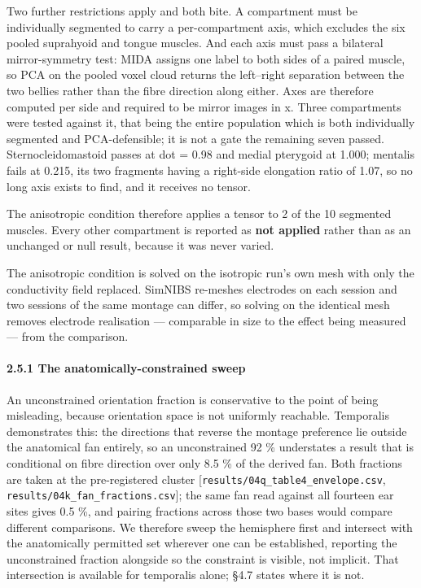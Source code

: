 \documentclass[
  11pt,
  letterpaper,
]{article}
\begin{document}
Two further restrictions apply and both bite. A compartment must be individually
segmented to carry a per-compartment axis, which excludes the six pooled
suprahyoid and tongue muscles. And each axis must pass a bilateral
mirror-symmetry test: MIDA assigns one label to both sides of a paired muscle,
so PCA on the pooled voxel cloud returns the left--right separation between the
two bellies rather than the fibre direction along either. Axes are therefore
computed per side and required to be mirror images in x. Three compartments were
tested against it, that being the entire population which is both individually
segmented and PCA-defensible; it is not a gate the remaining seven passed.
Sternocleidomastoid
passes at \textbar dot\textbar{} = 0.98 and medial pterygoid at 1.000; mentalis fails at 0.215,
its two fragments having a right-side elongation ratio of 1.07, so no long axis
exists to find, and it receives no tensor.

The anisotropic condition therefore applies a tensor to 2 of the 10 segmented
muscles. Every other compartment is reported as \textbf{not applied} rather than as
an unchanged or null result, because it was never varied.

The anisotropic condition is solved on the isotropic run's own mesh with only
the conductivity field replaced. SimNIBS re-meshes electrodes on each session
and two sessions of the same montage can differ, so solving on the identical
mesh removes electrode realisation --- comparable in size to the effect being
measured --- from the comparison.

\paragraph{2.5.1 The anatomically-constrained sweep}\label{the-anatomically-constrained-sweep}

An unconstrained orientation fraction is conservative to the point of being
misleading, because orientation space is not uniformly reachable. Temporalis
demonstrates this: the directions that reverse the montage preference lie
outside the anatomical fan entirely, so an unconstrained 92 \% understates a
result that is conditional on fibre direction over only 8.5 \% of the derived
fan. Both fractions are taken at the pre-registered cluster
{[}\texttt{results/04q\_table4\_envelope.csv}, \texttt{results/04k\_fan\_fractions.csv}{]}; the same
fan read against all fourteen ear sites gives 0.5 \%, and pairing fractions
across those two bases would compare different comparisons. We therefore sweep
the hemisphere first and intersect with the anatomically permitted set wherever
one can be established, reporting the unconstrained fraction alongside so the
constraint is visible, not implicit. That intersection is available for
temporalis alone; §4.7 states where it is not.
\end{document}
